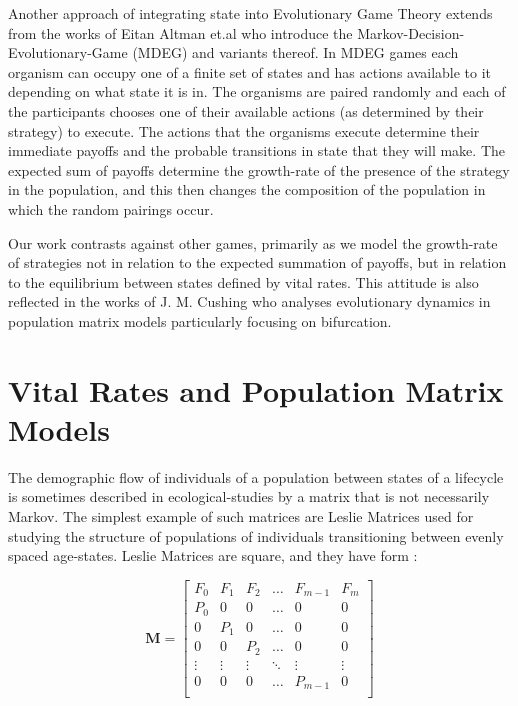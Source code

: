 Another approach of integrating state into Evolutionary Game Theory extends from the works of Eitan Altman et.al \cite{markov2,markov3,markov4,markov5,markov8,markov9} who introduce the Markov-Decision-Evolutionary-Game (MDEG) and variants thereof.
In MDEG games each organism can occupy one of a finite set of states and has actions available to it depending on what state it is in.
The organisms are paired randomly and each of the participants chooses one of their available actions (as determined by their strategy) to execute.
The actions that the organisms execute determine their immediate payoffs and the probable transitions in state that they will make.
The expected sum of payoffs determine the growth-rate of the presence of the strategy in the population, and this then changes the composition of the population in which the random pairings occur.

Our work contrasts against other games, primarily as we model the growth-rate of strategies not in relation to the expected summation of payoffs, but in relation to the equilibrium between states defined by vital rates. This attitude is also reflected in the works of J. M. Cushing \cite{doi:10.1080/10236198.2016.1177522, Cushing2017,doi:10.1080/17513758.2019.1574034} who analyses evolutionary dynamics in population matrix models particularly focusing on bifurcation.

\section{Vital Rates and Population Matrix Models}\label{sec:2}

The demographic flow of individuals of a population between states of a lifecycle is sometimes described in ecological-studies by a matrix that is not necessarily Markov.
The simplest example of such matrices are Leslie Matrices used for studying the structure of populations of individuals transitioning between evenly spaced age-states.
Leslie Matrices are square, and they have form \cite{leslie}:

\begin{equation*}
\mathbf{M}=\begin{bmatrix}
    F_0 & F_1 & F_2 & \dots & F_{m-1} & F_m  \\
    P_0 &  0  &  0  & \dots &  0      &  0   \\
     0  & P_1 &  0  & \dots &  0      &  0   \\
     0  &  0  & P_2 & \dots &  0      &  0   \\
    \vdots & \vdots & \vdots & \ddots & \vdots & \vdots \\
     0  &  0  &  0  & \dots  & P_{m-1} &  0   \\
\end{bmatrix}
\end{equation*}

